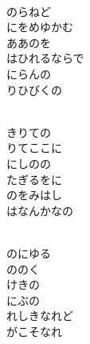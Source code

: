 \documentclass[10pt,b5j]{tarticle} %
\begin{document}
\begin{enumerate}
\begin{minipage}[c]{\blocksize}
        \vspace{\linespace}
        \item~\\
        のらねど\\
        にをめゆかむ\\
        ああのを\\
        はひれるならで\\
        にらんの\\
        りひびくの
        
        \vspace{\linespace}
        \item~\\
        きりての\\
        りてここに\\
        にしのの\\
        たぎるをに\\
        のをみはし\\
        はなんかなの
        
        \vspace{\linespace}
        \item~\\
        のにゆる\\
        ののく\\
        けきの\\
        にぶの\\
        れしきなれど\\
        がこそなれ
    
    \end{minipage}
\end{enumerate} %
\end{document}
